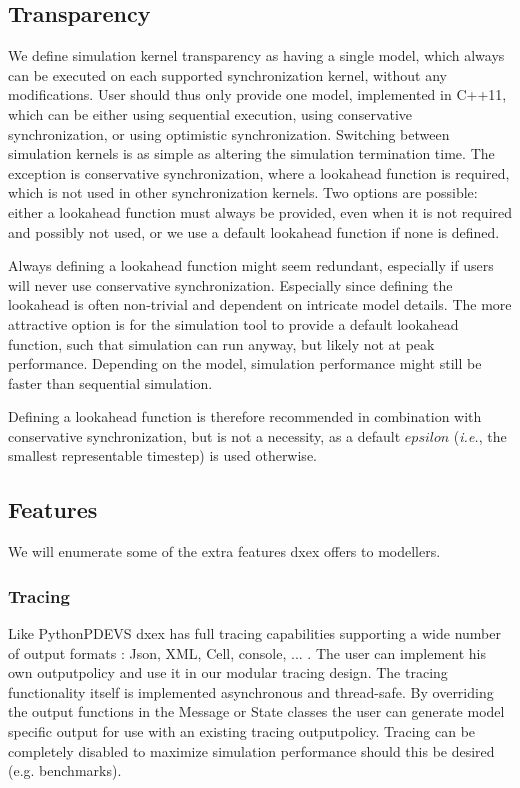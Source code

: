 \subsection{Transparency}
We define simulation kernel transparency as having a single model, which always can be executed on each supported synchronization kernel, without any modifications.
User should thus only provide one model, implemented in C++11, which can be either using sequential execution, using conservative synchronization, or using optimistic synchronization.
Switching between simulation kernels is as simple as altering the simulation termination time.
The exception is conservative synchronization, where a lookahead function is required, which is not used in other synchronization kernels.
Two options are possible: either a lookahead function must always be provided, even when it is not required and possibly not used, or we use a default lookahead function if none is defined.

Always defining a lookahead function might seem redundant, especially if users will never use conservative synchronization.
Especially since defining the lookahead is often non-trivial and dependent on intricate model details.
The more attractive option is for the simulation tool to provide a default lookahead function, such that simulation can run anyway, but likely not at peak performance.
Depending on the model, simulation performance might still be faster than sequential simulation. 

Defining a lookahead function is therefore recommended in combination with conservative synchronization, but is not a necessity, as a default $epsilon$ (\textit{i.e.}, the smallest representable timestep) is used otherwise.

\subsection{Features}
We will enumerate some of the extra features dxex offers to modellers.
\subsubsection{Tracing}
Like PythonPDEVS dxex has full tracing capabilities supporting a wide number of output formats : Json, XML, Cell, console, ... . The user can implement his own outputpolicy and use it in our modular tracing design. The tracing functionality itself is implemented asynchronous and thread-safe. By overriding the output functions in the Message or State classes the user can generate model specific output for use with an existing tracing outputpolicy. Tracing can be completely disabled to maximize simulation performance should this be desired (e.g. benchmarks). 
